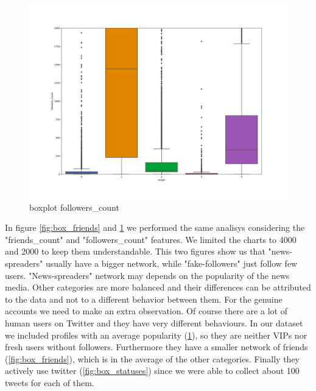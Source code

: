 \begin{figure}
	\centering
	\includegraphics[width=\columnwidth]{chapter3/figure/boxplot_followers.jpg}
	\caption{boxplot followers\_count}
	\label{fig:box_followers}
\end{figure}
In figure \ref{fig:box_friends} and \ref{fig:box_followers} we performed the same analisys considering the "friends\_count" and "followers\_count" features. We limited the charts to 4000 and 2000 to keep them understandable. This two figures show us that "news-spreaders" usually have a bigger network, while "fake-followers" just follow few users. "News-spreaders" network may depends on the popularity of the news media. Other categories are more balanced and their differences can be attributed to the data and not to a different behavior between them. For the genuine accounts we need to make an extra observation. Of course there are a lot of human users on Twitter and they have very different behaviours. In our dataset we included profiles with an average popularity (\ref{fig:box_followers}), so they are neither VIPs nor fresh users without followers. Furthermore they have a smaller network of friends (\ref{fig:box_friends}), which is in the average of the other categories. Finally they actively use twitter (\ref{fig:box_statuses}) since we were able to collect about 100 tweets for each of them. 